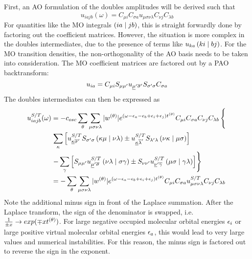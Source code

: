 First, an AO formulation of the doubles amplitudes will be derived such that
\begin{equation}
u_{iajb}(\omega) = C_{\mu i} C_{\sigma a} u_{\mu\sigma\nu\lambda} C_{\nu j} C_{\lambda b}
\end{equation}
\noindent For quantities like the MO integrals $\left( ia \mid jb \right)$, this is straight forwardly done by factoring out the coefficient matrices. However, the situation is more complex in the doubles intermediates, due to the presence of terms like $u_{ka}\left( ki \mid bj \right)$. For the MO transition densities, the non-orthogonality of the AO basis needs to be taken into consideration. The MO coefficient matrices are factored out by a PAO backtransform:
\begin{equation}
u_{ia} = C_{\mu i} S_{\mu\mu'} u_{\underline{\mu}'\overline{\sigma}'} S_{\sigma'\sigma} C_{\sigma a}
\end{equation}
The doubles intermediates can then be expressed as
\begin{equation}
\begin{split}
u_{iajb}^{S/T}(\omega) &= - c_{osc} \sum_{\theta} \sum_{\mu\sigma\nu\lambda} |w^{(\theta)}| e^{\left(\omega - \epsilon_a - \epsilon_b + \epsilon_i + \epsilon_j\right)t^{(\theta)}} C_{\mu i} C_{\sigma a} C_{\nu j} C_{\lambda b} \left\lbrace \vphantom{\sum_i} \right. \\
&\left. \sum_{\kappa} \left[ u^{S/T}_{\underline{\kappa}\overline{\sigma}'} S_{\sigma'\sigma} \left( \kappa \mu \mid \nu\lambda \right) \pm u^{S/T}_{\underline{\kappa}\overline{\lambda}'} S_{\lambda'\lambda} \left( \nu\kappa \mid \mu\sigma \right) \right] \right. \\
&\left. - \sum_{\gamma} \left[ S_{\mu\mu'} u^{S/T}_{\underline{\mu}'\overline{\sigma}} \left( \nu\lambda \mid \sigma\gamma \right) \pm S_{\nu\nu'} u^{S/T}_{\underline{\nu}'\overline{\gamma}} \left( \mu\sigma \mid \gamma\lambda \right) \right]   \right\rbrace \\
&= - \sum_{\theta} \sum_{\mu\sigma\nu\lambda} |w^{(\theta)}| e^{\left(\omega - \epsilon_a - \epsilon_b + \epsilon_i + \epsilon_j\right)t^{(\theta)}} C_{\mu i} C_{\sigma a} u_{\mu\sigma\nu\lambda}^{S/T} C_{\nu j} C_{\lambda b}
\end{split}
\label{eq:AODOUBLES}
\end{equation}
\noindent Note the additional minus sign in front of the Laplace summation. After the Laplace transform, the sign of the denominator is swapped, i.e. $\frac{1}{\pm x} \rightarrow exp(\mp x t^{(\theta)})$. For large negative occupied molecular orbital energies $\epsilon_i$ or large positive virtual molecular orbital energies $\epsilon_a$, this would lead to very large values and numerical instabilities. For this reason, the minus sign is factored out to reverse the sign in the exponent. 

